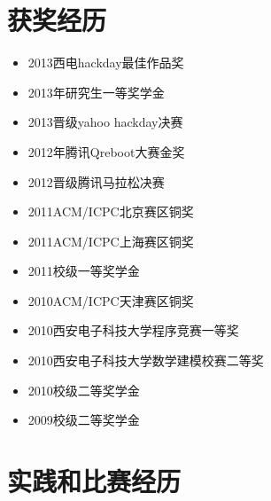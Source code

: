 \documentclass[]{friggeri-cv} %
\begin{document}

\section{获奖经历}

\begin{itemize}
    \item 2013西电hackday最佳作品奖
    \item 2013年研究生一等奖学金
    \item 2013晋级yahoo hackday决赛
    \item 2012年腾讯Qreboot大赛金奖
    \item 2012晋级腾讯马拉松决赛
    \item 2011ACM/ICPC北京赛区铜奖
    \item 2011ACM/ICPC上海赛区铜奖
    \item 2011校级一等奖学金
    \item 2010ACM/ICPC天津赛区铜奖
    \item 2010西安电子科技大学程序竞赛一等奖
    \item 2010西安电子科技大学数学建模校赛二等奖
    \item 2010校级二等奖学金
    \item 2009校级二等奖学金
\end{itemize}


\section{实践和比赛经历}
\end{document}
